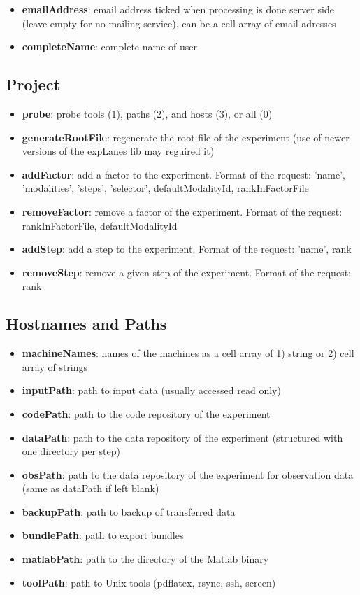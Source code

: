 \documentclass[a4paper,fleqn]{tufte-handout}
\begin{document}
\begin{itemize}
\item \textbf{emailAddress}: email address ticked when processing is done server side (leave empty for no mailing service), can be a cell array of email adresses
\item \textbf{completeName}: complete name of user
\end{itemize}

\subsection{Project}

\begin{itemize}
\item \textbf{probe}: probe tools (1), paths (2), and hosts (3), or all (0)
\item \textbf{generateRootFile}: regenerate the root file of the experiment (use of newer versions of the expLanes lib may reguired it)
\item \textbf{addFactor}: add a factor to the experiment. Format of the request: {'name', 'modalities', 'steps', 'selector', defaultModalityId, rankInFactorFile}
\item \textbf{removeFactor}: remove a factor of the experiment. Format of the request: {rankInFactorFile, defaultModalityId}
\item \textbf{addStep}: add a step to the experiment. Format of the request: {'name', rank}
\item \textbf{removeStep}: remove a given step of the experiment. Format of the request: rank
\end{itemize}

\subsection{Hostnames and Paths}



\begin{itemize}
\item \textbf{machineNames}: names of the machines as a cell array of 1) string or 2) cell array of strings
\item \textbf{inputPath}: path to input data (usually accessed read only)
\item \textbf{codePath}: path to the code repository of the experiment
\item \textbf{dataPath}: path to the data repository of the experiment  (structured with one directory per step)
\item \textbf{obsPath}: path to the data repository of the experiment for observation data (same as dataPath if left blank)
\item \textbf{backupPath}: path to backup of transferred data
\item \textbf{bundlePath}: path to export bundles
\item \textbf{matlabPath}: path to the directory of the Matlab binary 
\item \textbf{toolPath}: path to Unix tools (pdflatex, rsync, ssh, screen)
\end{itemize}
\end{document}
